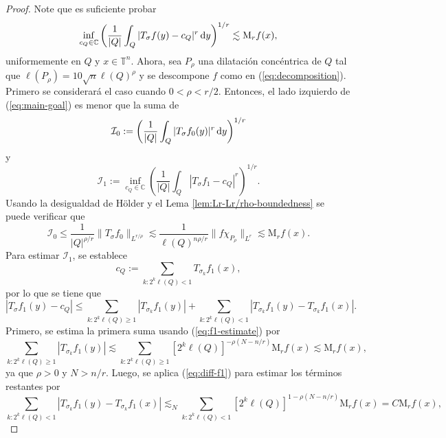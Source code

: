\begin{proof}
Note que es suficiente probar 
\begin{equation}
	\inf_{c_Q\in \mathbb{C}} \left( 
	\frac{1}{|Q|} \int_Q|T_\sigma f(y) - c_Q|^r\mathop{}\!\mathrm{d} y
	\right)^{1/r} \lesssim \mathrm{M}_rf(x) ,
	\label{eq:main-goal}
\end{equation}
uniformemente en $Q$ y $x\in \mathbb{T}^n$. Ahora, sea $P_\rho$ una dilatación concéntrica de $Q$ tal que $\ell(P_\rho) = 10\sqrt{n}\ell(Q)^\rho$ y se descompone $f$ como en (\ref{eq:decomposition}). Primero se considerará el caso cuando $0<\rho < r/2$. Entonces, el lado izquierdo de (\ref{eq:main-goal}) es menor que la suma de 
\begin{equation*}
	\mathcal{I}_0 := \left( 
	\frac{1}{|Q|} \int_Q|T_\sigma f_0(y)|^r\mathop{}\!\mathrm{d} y
	\right)^{1/r}
\end{equation*}
y 
\begin{equation*}
	\mathcal{I}_1 := \inf_{c_Q \in \mathbb{C}} \left(  \frac{1}{|Q|}\int_Q|T_\sigma f_1 - c_Q|^r
	\right)^{1/r}.
\end{equation*}
Usando la desigualdad de H\"older y el Lema \ref{lem:Lr-Lr/rho-boundedness} se puede verificar que 
\begin{equation*}
	\mathcal{I}_0 \leq \frac{1}{|Q|^{\rho/r}} \|T_\sigma f_0\|_{L^{r/\rho}} \lesssim\frac{1}{\ell(Q)^{n\rho/r}} \|f\chi_{P_\rho}\|_{L^r} \lesssim\mathrm{M}_rf(x). 
\end{equation*}
Para estimar $\mathcal{I}_1$, se establece 
\begin{equation}
	c_Q := \sum_{k:2^k\ell(Q)<1} T_{\sigma_k} f_1(x), 
	\label{eq:cQ}
\end{equation}
por lo que se tiene que
\begin{equation*}
	|T_\sigma f_1(y) - c_Q| \leq \sum_{k:2^k\ell(Q) \geq 1} |T_{\sigma_k}f_1(y)| + \sum_{k:2^k\ell(Q)<1}|T_{\sigma_k} f_1(y) - T_{\sigma_k} f_1(x)|  .
\end{equation*}
Primero, se estima la primera suma usando (\ref{eq:f1-estimate}) por
\begin{equation*}
	\sum_{k:2^k\ell(Q) \geq 1} |T_{\sigma_k}f_1(y)| \lesssim \sum_{k:2^k\ell(Q) \geq 1} [2^k\ell(Q)]^{-\rho(N-n/r)} \mathrm{M}_rf(x) \lesssim \mathrm{M}_rf(x),
\end{equation*}
ya que $\rho > 0$ y $N > n/r$. Luego, se aplica (\ref{eq:diff-f1}) para estimar los términos restantes por 
\begin{equation*}
	\sum_{k:2^k\ell(Q)<1}|T_{\sigma_k} f_1(y) - T_{\sigma_k} f_1(x)| \lesssim_N\sum_{k:2^k\ell(Q)<1} [2^k\ell(Q)]^{1-\rho(N-n/r)}\mathrm{M}_r f(x) = C\mathrm{M}_rf(x),

\end{equation*}
\end{proof}
